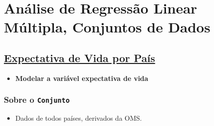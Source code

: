 \documentclass[12pt]{abntex2}
\date{\today}
\title{}
\begin{document}
\tableofcontents
\clearpage


\chapter{Análise de Regressão Linear Múltipla, Conjuntos de Dados}
\label{sec:org395f2a7}
\section{\href{https://www.kaggle.com/augustus0498/life-expectancy-who}{Expectativa de Vida por País}}
\label{sec:orgd4e053d}
\begin{itemize}
\item \textbf{Modelar a variável expectativa de vida}
\end{itemize}
\subsection{Sobre o \texttt{Conjunto}}
\label{sec:orgfb4a40c}
\begin{itemize}
\item Dados de todos países, derivados da OMS.
\end{itemize}
\end{document}
